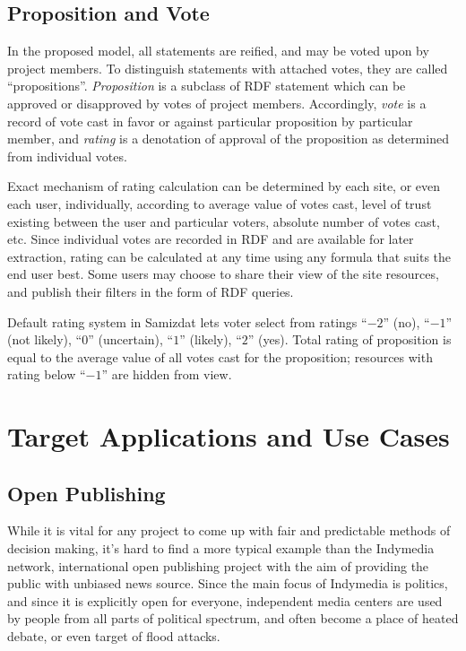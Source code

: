 \documentclass{llncs}
\begin{document}
\subsection{Proposition and Vote}

In the proposed model, all statements are reified, and may be voted upon by
project members. To distinguish statements with attached votes, they are
called ``propositions''. \emph{Proposition} is a subclass of RDF statement
which can be approved or disapproved by votes of project members. Accordingly,
\emph{vote} is a record of vote cast in favor or against particular
proposition by particular member, and \emph{rating} is a denotation of
approval of the proposition as determined from individual votes.

Exact mechanism of rating calculation can be determined by each site, or even
each user, individually, according to average value of votes cast, level of
trust existing between the user and particular voters, absolute number of
votes cast, etc. Since individual votes are recorded in RDF and are available
for later extraction, rating can be calculated at any time using any formula
that suits the end user best. Some users may choose to share their view of the
site resources, and publish their filters in the form of RDF queries.

Default rating system in Samizdat lets voter select from ratings ``$-2$''
(no), ``$-1$'' (not likely), ``$0$'' (uncertain), ``$1$'' (likely), ``$2$''
(yes). Total rating of proposition is equal to the average value of all votes
cast for the proposition; resources with rating below ``$-1$'' are hidden from
view.


\section{Target Applications and Use Cases}
%
\subsection{Open Publishing}

While it is vital for any project to come up with fair and predictable methods
of decision making, it's hard to find a more typical example than the
Indymedia network, international open publishing project with the aim of
providing the public with unbiased news source\cite{openpub}. Since the main
focus of Indymedia is politics, and since it is explicitly open for everyone,
independent media centers are used by people from all parts of political
spectrum, and often become a place of heated debate, or even target of flood
attacks.
\end{document}
